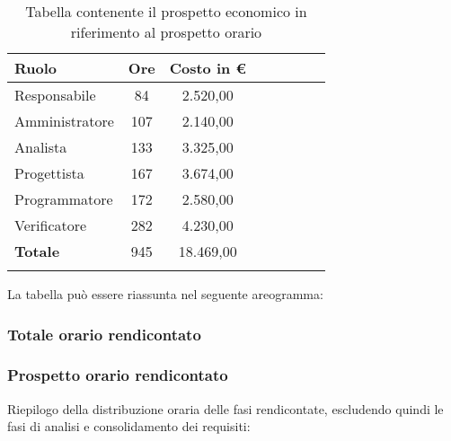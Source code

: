 			\begin{longtable}{|l|c|c|c|c|c|c|c|}
				\hline
				\rowcolor{lighter-grayer}
				\textbf{Ruolo} & \textbf{Ore} & \textbf{Costo in €} \\
				\hline
				\endfirsthead
				
				\hline
				Responsabile & 84 & 2.520,00\\
				\hline
				\hline
				Amministratore & 107 & 2.140,00\\
				\hline
				\hline
				Analista & 133 & 3.325,00\\
				\hline
				\hline
				Progettista & 167 & 3.674,00\\
				\hline
				\hline
				Programmatore & 172 & 2.580,00\\
				\hline
				\hline
				Verificatore & 282 & 4.230,00\\
				\hline
				\textbf{Totale} & 945 & 18.469,00\\
				\hline
				\caption{Tabella contenente il prospetto economico in riferimento al prospetto orario}
			\end{longtable}
			\pagebreak
		
			La tabella può essere riassunta nel seguente areogramma:

			\subsubsection{Totale orario rendicontato}
			\subsubsection{Prospetto orario rendicontato}
			Riepilogo della distribuzione oraria delle fasi rendicontate, escludendo quindi le fasi di
analisi e consolidamento dei requisiti:
			
